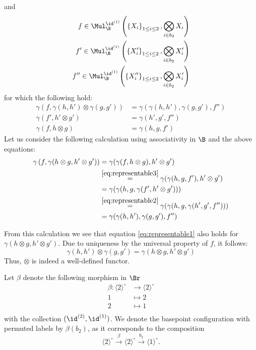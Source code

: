 \begin{const}
    and
    \begin{align*}
        f \in \Mul_{\B}^{\id^{(1)}}\left(\left\{X_i\right\}_{1 \leq i \leq 2},
    \bigotimes_{i \in b_2} X_i\right) \\
    f' \in \Mul_{\B}^{\id^{(1)}}\left(\left\{X_i'\right\}_{1 \leq i \leq 2},
    \bigotimes_{i \in b_2} X_i'\right) \\
    f'' \in \Mul_{\B}^{\id^{(1)}}\left(\left\{X_i''\right\}_{1 \leq i \leq 2},
    \bigotimes_{i \in b_2} X_i'\right)
    \end{align*}
    for which the following hold:
    \begin{align}%
        \gamma(f, \gamma(h,h') \otimes \gamma(g,g')) &= \gamma(\gamma(h,h'), \gamma(g,g'), f'') \label{eq:representable1}\\
        \gamma(f', h' \otimes g') &= \gamma(h',g',f'') \label{eq:representable2}\\
        \gamma(f, h \otimes g) &= \gamma(h,g,f') \label{eq:representable3}
    \end{align}
    Let us consider the following calculation using associativity in $\B$ and
    the above equations:
    \begin{align*}
        \gamma\left(f, \gamma(h \otimes g, h' \otimes g')\right) &= \gamma(\gamma(f, h \otimes g), h' \otimes g') \\
        & \overset{\eqref{eq:representable3}}{=} \gamma(\gamma(h,g,f'), h' \otimes g') \\ 
        & = \gamma(\gamma(h,g, \gamma(f', h' \otimes g'))) \\
        & \overset{\eqref{eq:representable2}}{=}   \gamma(\gamma(h,g,\gamma(h',g',f''))) \\
        & = \gamma(\gamma(h,h'), \gamma(g,g'), f'') 
    \end{align*}

    From this calculation we see that equation \eqref{eq:representable1} also holds for $\gamma(h
    \otimes g, h' \otimes g')$. Due to uniqueness by the universal property of
    $f$, it follows:
    \[
        \gamma(h,h') \otimes \gamma(g,g') = \gamma(h \otimes g, h' \otimes g')
    \]
    Thus, $\otimes$ is indeed a well-defined functor.
    

    Let $\beta$ denote the following morphism in $\Br$
     \begin{align*}
         \beta \colon \langle 2 \rangle^{\circ} &\to \langle 2 \rangle^{\circ} \\
         1 &\mapsto 2 \\
         2 &\mapsto 1 \\
     \end{align*}
    with the collection $(\id^{(2)}, \id^{(1)})$. We denote the basepoint
    configuration with permuted labels by $\beta(b_2)$, as it corresponds to the
    composition
    \[
     \langle 2 \rangle^{\circ} \overset{\beta}{\to} \langle 2 \rangle^{\circ} \overset{b_2}{\to} \langle 1 \rangle^{\circ}.
    \]


\end{const}
